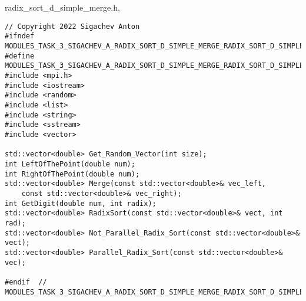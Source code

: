 \documentclass[12pt,a4paper]{article}
\begin{document}
\section{} radix\_sort\_d\_simple\_merge.h,
\begin{lstlisting}
// Copyright 2022 Sigachev Anton
#ifndef MODULES_TASK_3_SIGACHEV_A_RADIX_SORT_D_SIMPLE_MERGE_RADIX_SORT_D_SIMPLE_MERGE_H_
#define MODULES_TASK_3_SIGACHEV_A_RADIX_SORT_D_SIMPLE_MERGE_RADIX_SORT_D_SIMPLE_MERGE_H_
#include <mpi.h>
#include <iostream>
#include <random>
#include <list>
#include <string>
#include <sstream>
#include <vector>

std::vector<double> Get_Random_Vector(int size);
int LeftOfThePoint(double num);
int RightOfThePoint(double num);
std::vector<double> Merge(const std::vector<double>& vec_left,
    const std::vector<double>& vec_right);
int GetDigit(double num, int radix);
std::vector<double> RadixSort(const std::vector<double>& vect, int rad);
std::vector<double> Not_Parallel_Radix_Sort(const std::vector<double>& vect);
std::vector<double> Parallel_Radix_Sort(const std::vector<double>& vec);

#endif  // MODULES_TASK_3_SIGACHEV_A_RADIX_SORT_D_SIMPLE_MERGE_RADIX_SORT_D_SIMPLE_MERGE_H_

\end{lstlisting}
\end{document}
